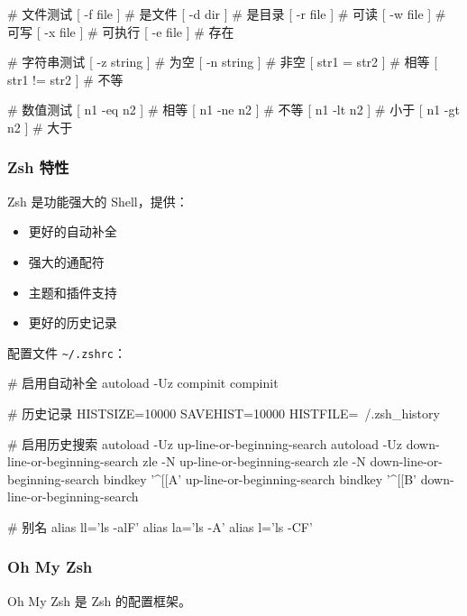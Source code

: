 
\begin{lstcode}[numbers=none]
  # 文件测试
  [ -f file ]    # 是文件
  [ -d dir ]     # 是目录
  [ -r file ]    # 可读
  [ -w file ]    # 可写
  [ -x file ]    # 可执行
  [ -e file ]    # 存在

  # 字符串测试
  [ -z string ]  # 为空
  [ -n string ] # 非空
  [ str1 = str2 ] # 相等
  [ str1 != str2 ] # 不等

  # 数值测试
  [ n1 -eq n2 ]  # 相等
  [ n1 -ne n2 ]  # 不等
  [ n1 -lt n2 ]  # 小于
  [ n1 -gt n2 ]  # 大于
\end{lstcode}

\subsubsection{Zsh 特性}

Zsh 是功能强大的 Shell，提供：

\begin{itemize}
  \item 更好的自动补全
  \item 强大的通配符
  \item 主题和插件支持
  \item 更好的历史记录
\end{itemize}


配置文件 \lstinline{~/.zshrc}：

\begin{lstcode}[numbers=none]
  # 启用自动补全
  autoload -Uz compinit
  compinit

  # 历史记录
  HISTSIZE=10000
  SAVEHIST=10000
  HISTFILE=~/.zsh_history

  # 启用历史搜索
  autoload -Uz up-line-or-beginning-search
  autoload -Uz down-line-or-beginning-search
  zle -N up-line-or-beginning-search
  zle -N down-line-or-beginning-search
  bindkey '^[[A' up-line-or-beginning-search
  bindkey '^[[B' down-line-or-beginning-search

  # 别名
  alias ll='ls -alF'
  alias la='ls -A'
  alias l='ls -CF'
\end{lstcode}

\subsubsection{Oh My Zsh}

Oh My Zsh 是 Zsh 的配置框架。


